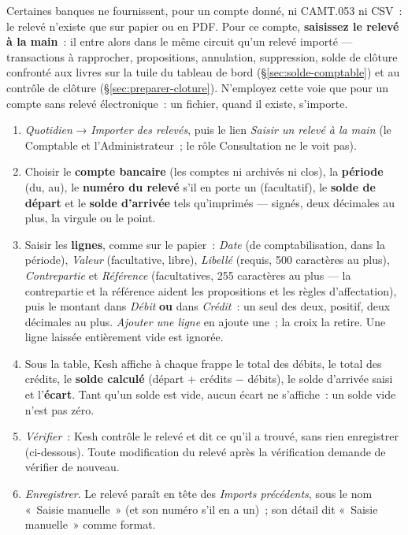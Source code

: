 \documentclass[a4paper,11pt,oneside]{article}
\begin{document}
Certaines banques ne fournissent, pour un compte donné, ni CAMT.053 ni CSV~: le relevé n'existe
que sur papier ou en PDF. Pour ce compte, \textbf{saisissez le relevé à la main}~: il entre alors
dans le même circuit qu'un relevé importé --- transactions à rapprocher, propositions,
annulation, suppression, solde de clôture confronté aux livres sur la tuile du tableau de bord
(\S\ref{sec:solde-comptable}) et au contrôle de clôture (\S\ref{sec:preparer-cloture}). N'employez
cette voie que pour un compte sans relevé électronique~: un fichier, quand il existe, s'importe.

\begin{enumerate}
    \item \emph{Quotidien} → \emph{Importer des relevés}, puis le lien \emph{Saisir un relevé à la
    main} (le Comptable et l'Administrateur~; le rôle Consultation ne le voit pas).
    \item Choisir le \textbf{compte bancaire} (les comptes ni archivés ni clos), la
    \textbf{période} (du, au), le \textbf{numéro du relevé} s'il en porte un (facultatif), le
    \textbf{solde de départ} et le \textbf{solde d'arrivée} tels qu'imprimés --- signés, deux
    décimales au plus, la virgule ou le point.
    \item Saisir les \textbf{lignes}, comme sur le papier~: \emph{Date} (de comptabilisation,
    dans la période), \emph{Valeur} (facultative, libre), \emph{Libellé} (requis, 500 caractères
    au plus), \emph{Contrepartie} et \emph{Référence} (facultatives, 255 caractères au plus ---
    la contrepartie et la référence aident les propositions et les règles d'affectation),
    puis le montant dans \emph{Débit} \textbf{ou} dans \emph{Crédit}~: un seul des deux, positif,
    deux décimales au plus. \emph{Ajouter une ligne} en ajoute une~; la croix la retire. Une
    ligne laissée entièrement vide est ignorée.
    \item Sous la table, Kesh affiche à chaque frappe le total des débits, le total des crédits,
    le \textbf{solde calculé} (départ + crédits − débits), le solde d'arrivée saisi et
    l'\textbf{écart}. Tant qu'un solde est vide, aucun écart ne s'affiche~: un solde vide n'est
    pas zéro.
    \item \emph{Vérifier}~: Kesh contrôle le relevé et dit ce qu'il a trouvé, sans rien
    enregistrer (ci-dessous). Toute modification du relevé après la vérification demande de
    vérifier de nouveau.
    \item \emph{Enregistrer}. Le relevé paraît en tête des \emph{Imports précédents}, sous le
    nom «~Saisie manuelle~» (et son numéro s'il en a un)~; son détail dit «~Saisie manuelle~»
    comme format.
\end{enumerate}
\end{document}
